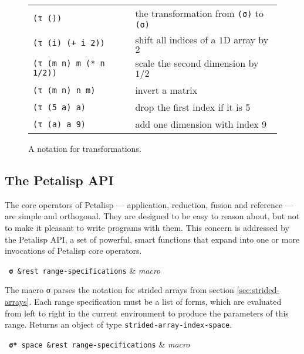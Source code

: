 \begin{figure}[htb]
  \begin{tabular}{ll}
    \texttt{(τ ())} & \hspace*{-1em} the transformation from \texttt{(σ)} to \texttt{(σ)} \\
    \texttt{(τ (i) (+ i 2))} & \hspace*{-1em} shift all indices of a $1$D array by $2$ \\
    \texttt{(τ (m n) m (* n 1/2))} & \hspace*{-1em} scale the second dimension by $1/2$ \\
    \texttt{(τ (m n) n m)} & \hspace*{-1em} invert a matrix \\
    \texttt{(τ (5 a) a)} & \hspace*{-1em} drop the first index if it is 5 \\
    \texttt{(τ (a) a 9)} & \hspace*{-1em} add one dimension with index 9 \\
  \end{tabular}
  \caption{A notation for transformations.}
  \label{fig:transformation-examples}
\end{figure}

\subsection{The Petalisp API}

The core operators of Petalisp --- application, reduction, fusion and
reference --- are simple and orthogonal. They are designed to be easy to
reason about, but not to make it pleasant to write programs with them. This
concern is addressed by the Petalisp API, a set of powerful, smart
functions that expand into one or more invocations of Petalisp core
operators.

\begin{function}
  \texttt{ \textbf{σ} \&rest range-specifications} & \textsl{macro} \\
\end{function}

The macro σ parses the notation for strided arrays from section
\ref{sec:strided-arrays}. Each range specification must be a list of forms,
which are evaluated from left to right in the current environment to
produce the parameters of this range. Returns an object of type
\texttt{strided-array-index-space}.

\begin{function}
  \texttt{ \textbf{σ*} space \&rest range-specifications} & \textsl{macro} \\
\end{function}

